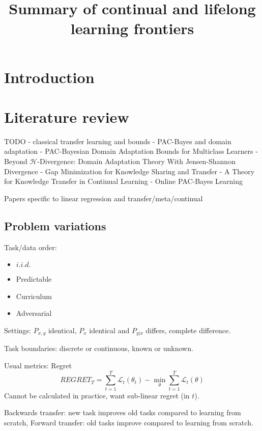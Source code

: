 \documentclass[letterpaper]{article}
\title{Summary of continual and lifelong learning frontiers}
\theoremstyle{definition}
\begin{document}
	
	\maketitle
	
	
\section{Introduction}
	

\section{Literature review}

TODO
- classical transfer learning and bounds
- PAC-Bayes and domain adaptation \citep{germain2020pac}
- PAC-Bayesian Domain Adaptation Bounds for Multiclass Learners \citep{sicilia2022pac}
- Beyond $\mathcal{H}$-Divergence: Domain Adaptation Theory With Jensen-Shannon Divergence \citep{shui2020beyond}
- Gap Minimization for Knowledge Sharing and Transfer \citep{wang2022gap}
- A Theory for Knowledge Transfer in Continual Learning \citep{benavides2022theory}
- Online PAC-Bayes Learning \citep{haddouche2022online}

Papers specific to linear regression and transfer/meta/continual

\subsection{Problem variations}

Task/data order:
\begin{itemize}
	\item $i.i.d.$
	\item Predictable
	\item Curriculum
	\item Adversarial
\end{itemize}

Settings: $P_{x,y}$ identical, $P_x$ identical and $P_{y|x}$ differs, complete difference.

Task boundaries: discrete or continuous, known or unknown.

Usual metrics:
Regret $$REGRET_T = \sum_{t=1}^{T}\mathcal{L}_t(\theta_t)-\min_\theta \sum_{t=1}^{T}\mathcal{L}_t(\theta)$$
Cannot be calculated in practice, want sub-linear regret (in $t$).

Backwards transfer: new task improves old tasks compared to learning from scratch, Forward transfer: old tasks improve compared to learning from scratch.
\end{document}
